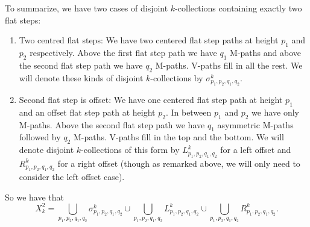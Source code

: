 \documentclass[11pt]{article}
\theoremstyle{mythm}
\begin{document}
To summarize, we have two cases of disjoint $k$-collections containing exactly two flat steps:
\begin{enumerate}[label=(\alph*)]
\item Two centred flat steps: We have two centered flat step paths at height $p_1$ and $p_2$ respectively. Above the first flat step path we have $q_1$ M-paths and above the second flat step path we have $q_2$ M-paths. V-paths fill in all the rest. We will denote these kinds of disjoint $k$-collections by $\sigma_{p_1,p_2,q_1,q_2}^k$.
\item Second flat step is offset: We have one centered flat step path at height $p_1$ and an offset flat step path at height $p_2$. In between $p_1$ and $p_2$ we have only M-paths. Above the second flat step path we have $q_1$ asymmetric M-paths followed by $q_2$ M-paths. V-paths fill in the top and the bottom. We will denote disjoint $k$-collections of this form by $L_{p_1,p_2,q_1,q_2}^k$ for a left offset and $R_{p_1,p_2,q_1,q_2}^k$ for a right offset (though as remarked above, we will only need to consider the left offset case).
\end{enumerate}

So we have that
\begin{equation*}
X_{k}^2 = \bigcup\limits_{p_1,p_2,q_1,q_2}\sigma_{p_1,p_2,q_1,q_2}^k \cup \bigcup\limits_{p_1,p_2,q_1,q_2}L_{p_1,p_2,q_1,q_2}^k \cup \bigcup\limits_{p_1,p_2,q_1,q_2}R_{p_1,p_2,q_1,q_2}^k.
\end{equation*}
\end{document}
